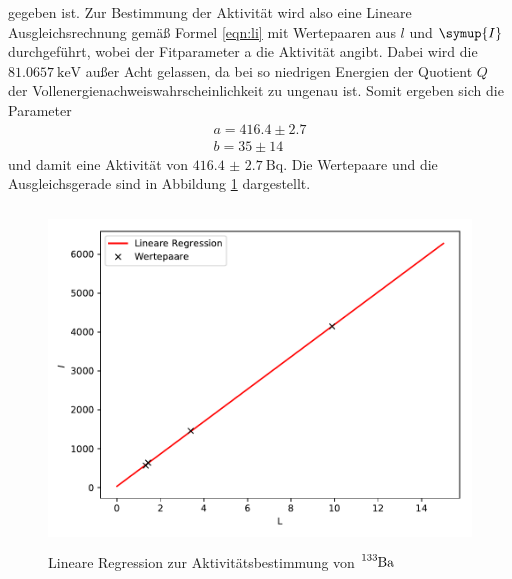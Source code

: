 gegeben ist. Zur Bestimmung der Aktivität wird also eine Lineare Ausgleichsrechnung
gemäß Formel \ref{eqn:li} mit Wertepaaren aus $l$ und $\symup{I}$ durchgeführt,
wobei der Fitparameter a die Aktivität angibt. Dabei wird die $\SI{81.0657}{\kilo\electronvolt}$
außer Acht gelassen, da bei so niedrigen Energien der Quotient $Q$ der Vollenergienachweiswahrscheinlichkeit
zu ungenau ist. Somit ergeben sich die Parameter
\begin{align*}
  a = 416.4 \pm 2.7 \\
  b = 35 \pm 14
\end{align*}
und damit eine Aktivität von $\SI{416.4(27)}{\becquerel} $.
Die Wertepaare und die Ausgleichsgerade sind in Abbildung \ref{fig:plot9} dargestellt.
\begin{figure}
  \centering
  \includegraphics[height=9cm]{Plot9.pdf}
  \caption{Lineare Regression zur Aktivitätsbestimmung von $\ce{^{133}Ba}$}
  \label{fig:plot9}
\end{figure}



